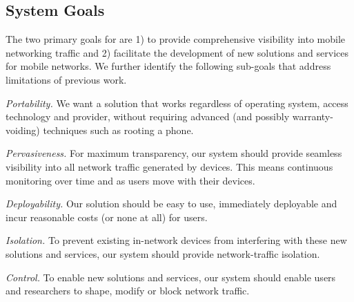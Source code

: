 
\subsection{System Goals}
The two primary goals for \meddle are 1) to provide comprehensive visibility into 
mobile networking traffic and 2) facilitate the development of new solutions 
and services for mobile networks. We further identify the following sub-goals 
that address limitations of previous work.

\begin{packeditemize}
\item \emph{Portability.} We want a solution that works regardless of operating system, 
access technology and provider, without requiring advanced (and possibly warranty-voiding) 
techniques such as rooting a phone. 
\item \emph{Pervasiveness.} For maximum transparency, our system should provide seamless 
visibility into all network traffic generated by devices. This means continuous monitoring 
over time and as users move with their devices.
\item \emph{Deployability.} Our solution should be easy to use, immediately deployable 
and incur reasonable costs (or none at all) for users. 
\item \emph{Isolation.} To prevent existing in-network devices from interfering with these new 
solutions and services, our system should provide network-traffic isolation. 
\item \emph{Control.} To enable new solutions and services, our system should enable users and researchers 
to shape, modify or block network traffic. 
\end{packeditemize}

